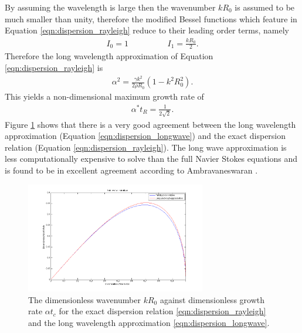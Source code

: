 \documentclass[11pt]{article}
\begin{document}
By assuming the wavelength is large then the wavenumber $kR_0$ is assumed to be 
much smaller than unity, therefore the modified Bessel functions which feature 
in Equation \ref{eqn:dispersion_rayleigh} reduce to their leading order terms, 
namely
\begin{align*}
I_0 = 1 \hspace{2cm} I_1 = \frac{kR_0}{2}.
\end{align*}
Therefore the long wavelength approximation of Equation 
\ref{eqn:dispersion_rayleigh} is
\begin{align}
\alpha^2 = \frac{\gamma k^2}{2 \rho R_0} (1 - k^2 R_0^2).
\label{eqn:dispersion_longwave}
\end{align}
This yields a non-dimensional maximum growth rate of 
\begin{align*}
\alpha^* t_R = \frac{1}{2 \sqrt{2}}.
\label{eqn:inviscid_max_growth}
\end{align*}
Figure \ref{fig:dispersion_compare} shows that there is a very good agreement 
between the long wavelength approximation (Equation \ref{eqn:dispersion_longwave}) 
and the exact dispersion relation (Equation \ref{eqn:dispersion_rayleigh}). The 
long wave approximation is less computationally expensive to solve than the 
full Navier Stokes equations and is found to be in excellent agreement 
according to Ambravaneswaran \cite{ambravaneswaran2002drop}.
\begin{figure}[h]
\begin{center}
	\includegraphics[width = 0.7\textwidth]{img/dispersion_comparison.png}
	\caption{The dimensionless wavenumber $kR_0$ against dimensionless growth 
rate $\alpha t_c$ for the exact dispersion relation \ref{eqn:dispersion_rayleigh} 
and the long wavelength approximation \ref{eqn:dispersion_longwave}.}
	\label{fig:dispersion_compare}
\end{center}
\end{figure} 
\end{document}
